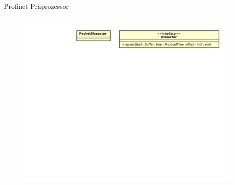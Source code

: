 \begin{frame}{Profinet Präprozessor}
    \begin{figure}
    	\centering
    	\includegraphics[width=\textwidth]{./images/dissector/2.pdf}
    \end{figure}
\end{frame}
